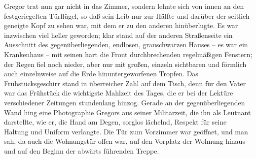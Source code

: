 Gregor trat nun gar nicht in das Zimmer, sondern lehnte sich von innen
an den festgeriegelten Türflügel, so daß sein Leib nur zur Hälfte und
darüber der seitlich geneigte Kopf zu sehen war, mit dem er zu den
anderen hinüberlugte. Es war inzwischen viel heller geworden; klar stand
auf der anderen Straßenseite ein Ausschnitt des gegenüberliegenden,
endlosen, grauschwarzen Hauses -- es war ein Krankenhaus -- mit seinen
hart die Front durchbrechenden regelmäßigen Fenstern; der Regen fiel
noch nieder, aber nur mit großen, einzeln sichtbaren und förmlich auch
einzelnweise auf die Erde hinuntergeworfenen Tropfen. Das
Frühstücksgeschirr stand in überreicher Zahl auf dem Tisch, denn für den
Vater war das Frühstück die wichtigste Mahlzeit des Tages, die er bei
der Lektüre verschiedener Zeitungen stundenlang hinzog. Gerade an der
gegenüberliegenden Wand hing eine Photographie Gregors aus seiner
Militärzeit, die ihn als Leutnant darstellte, wie er, die Hand am Degen,
sorglos lächelnd, Respekt für seine Haltung und Uniform verlangte. Die
Tür zum Vorzimmer war geöffnet, und man sah, da auch die Wohnungstür
offen war, auf den Vorplatz der Wohnung hinaus und auf den Beginn der
abwärts führenden Treppe.

